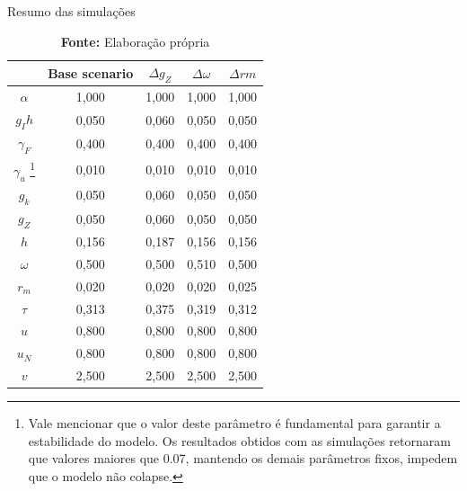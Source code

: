 \documentclass[
article,			%
12pt,				%
a4paper,			%
hidelinks,
oneside,
english,			%
brazil				%
]{abntex2}
\begin{document}
\begin{appendices}
\begin{table}[htb]
\tiny
    \centering
    \caption{Resumo das simulações}
    \label{Resumo_Simulacao}
         \begin{tabular}{ccccc}
\toprule
{} &  Base scenario &  $\Delta g_Z$ &  $\Delta \omega$ &  $\Delta rm$ \\
\midrule
\textbf{$\alpha$    } &          1,000 &         1,000 &            1,000 &        1,000 \\
\textbf{$g_Ih$     } &          0,050 &         0,060 &            0,050 &        0,050 \\
\textbf{$\gamma_F$  } &          0,400 &         0,400 &            0,400 &        0,400 \\
\textbf{$\gamma_u$  }\footnote{Vale mencionar que o valor deste parâmetro é fundamental para garantir a estabilidade do modelo. Os resultados obtidos com as simulações retornaram que valores maiores que 0.07, mantendo os demais parâmetros fixos, impedem que o modelo não colapse.}
                      &          0,010 &         0,010 &            0,010 &        0,010 \\
\textbf{$g_k$       } &          0,050 &         0,060 &            0,050 &        0,050 \\
\textbf{$g_Z$       } &          0,050 &         0,060 &            0,050 &        0,050 \\
\textbf{$h$        } &          0,156 &         0,187 &            0,156 &        0,156 \\
\textbf{$\omega$    } &          0,500 &         0,500 &            0,510 &        0,500 \\
\textbf{$r_m$       } &          0,020 &         0,020 &            0,020 &        0,025 \\
\textbf{$\tau$      } &          0,313 &         0,375 &            0,319 &        0,312 \\
\textbf{$u$        } &          0,800 &         0,800 &            0,800 &        0,800 \\
\textbf{$u_N$       } &          0,800 &         0,800 &            0,800 &        0,800 \\
\textbf{$v$        } &          2,500 &         2,500 &            2,500 &        2,500 \\
\bottomrule
\end{tabular}
    \label{Summary_Simplest}
    \caption*{\textbf{Fonte:} Elaboração própria}
\end{table}

\end{appendices}
\end{document}
